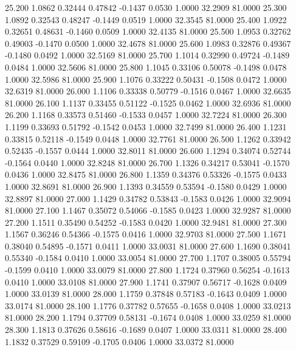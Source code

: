   25.200   1.0862   0.32444   0.47842  -0.1437   0.0530   1.0000  32.2909  81.0000
  25.300   1.0892   0.32543   0.48247  -0.1449   0.0519   1.0000  32.3545  81.0000
  25.400   1.0922   0.32651   0.48631  -0.1460   0.0509   1.0000  32.4135  81.0000
  25.500   1.0953   0.32762   0.49003  -0.1470   0.0500   1.0000  32.4678  81.0000
  25.600   1.0983   0.32876   0.49367  -0.1480   0.0492   1.0000  32.5169  81.0000
  25.700   1.1014   0.32990   0.49724  -0.1489   0.0484   1.0000  32.5606  81.0000
  25.800   1.1045   0.33106   0.50078  -0.1498   0.0478   1.0000  32.5986  81.0000
  25.900   1.1076   0.33222   0.50431  -0.1508   0.0472   1.0000  32.6319  81.0000
  26.000   1.1106   0.33338   0.50779  -0.1516   0.0467   1.0000  32.6635  81.0000
  26.100   1.1137   0.33455   0.51122  -0.1525   0.0462   1.0000  32.6936  81.0000
  26.200   1.1168   0.33573   0.51460  -0.1533   0.0457   1.0000  32.7224  81.0000
  26.300   1.1199   0.33693   0.51792  -0.1542   0.0453   1.0000  32.7499  81.0000
  26.400   1.1231   0.33815   0.52118  -0.1549   0.0448   1.0000  32.7761  81.0000
  26.500   1.1262   0.33942   0.52435  -0.1557   0.0444   1.0000  32.8011  81.0000
  26.600   1.1294   0.34074   0.52744  -0.1564   0.0440   1.0000  32.8248  81.0000
  26.700   1.1326   0.34217   0.53041  -0.1570   0.0436   1.0000  32.8475  81.0000
  26.800   1.1359   0.34376   0.53326  -0.1575   0.0433   1.0000  32.8691  81.0000
  26.900   1.1393   0.34559   0.53594  -0.1580   0.0429   1.0000  32.8897  81.0000
  27.000   1.1429   0.34782   0.53843  -0.1583   0.0426   1.0000  32.9094  81.0000
  27.100   1.1467   0.35072   0.54066  -0.1585   0.0423   1.0000  32.9287  81.0000
  27.200   1.1511   0.35490   0.54252  -0.1583   0.0420   1.0000  32.9481  81.0000
  27.300   1.1567   0.36246   0.54366  -0.1575   0.0416   1.0000  32.9703  81.0000
  27.500   1.1671   0.38040   0.54895  -0.1571   0.0411   1.0000  33.0031  81.0000
  27.600   1.1690   0.38041   0.55340  -0.1584   0.0410   1.0000  33.0054  81.0000
  27.700   1.1707   0.38005   0.55794  -0.1599   0.0410   1.0000  33.0079  81.0000
  27.800   1.1724   0.37960   0.56254  -0.1613   0.0410   1.0000  33.0108  81.0000
  27.900   1.1741   0.37907   0.56717  -0.1628   0.0409   1.0000  33.0139  81.0000
  28.000   1.1759   0.37848   0.57183  -0.1643   0.0409   1.0000  33.0174  81.0000
  28.100   1.1776   0.37782   0.57655  -0.1658   0.0408   1.0000  33.0213  81.0000
  28.200   1.1794   0.37709   0.58131  -0.1674   0.0408   1.0000  33.0259  81.0000
  28.300   1.1813   0.37626   0.58616  -0.1689   0.0407   1.0000  33.0311  81.0000
  28.400   1.1832   0.37529   0.59109  -0.1705   0.0406   1.0000  33.0372  81.0000
